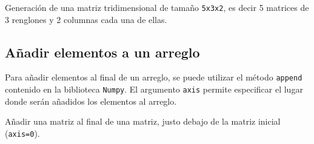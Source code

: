 \begin{code} Generación de una matriz tridimensional de tamaño \texttt{5x3x2}, es decir 5 matrices de 3 renglones y 
2 columnas cada una de ellas.

\begin{Shaded}
\begin{Highlighting}[]
\OperatorTok{=}\NormalTok{, }\NormalTok{, }\NormalTok{) }

\end{Highlighting}
\end{Shaded}
\end{code}

\subsection{Añadir elementos a un arreglo}

Para añadir elementos al final de un arreglo, se puede utilizar el
método \texttt{append} contenido en la biblioteca \texttt{Numpy}. El
argumento \texttt{axis} permite especificar el lugar donde serán
añadidos los elementos al arreglo.\\

\begin{code}
Añadir una matriz al final de una matriz, justo debajo de la matriz inicial (\texttt{axis=0}).

\begin{Shaded}
\begin{Highlighting}[]
\OperatorTok{=}\NormalTok{ np.append([[}\NormalTok{, }\NormalTok{], [}\NormalTok{, }\NormalTok{]], [[}\NormalTok{, }\NormalTok{], [}\NormalTok{, }\NormalTok{]], axis}\OperatorTok{=}\NormalTok{)}

\end{Highlighting}
\end{Shaded}
\end{code}

